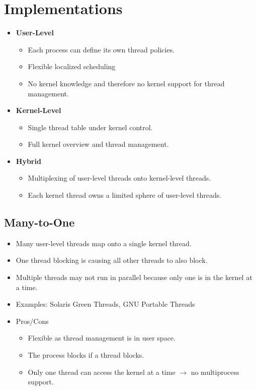 \documentclass[a4paper, 11pt, accentcolor = tud3b]{tudreport}
\providecommand{\pro}{\item[+]}
\providecommand{\con}{\item[- ]}
\begin{document}
        \section{Implementations}
            \begin{itemize}
            	\item \textbf{User-Level}
	            	\begin{itemize}
	            		\pro Each process can define its own thread policies.
	            		\pro Flexible localized scheduling
	            		\con No kernel knowledge and therefore no kernel support for thread management.
	            	\end{itemize}
            	\item \textbf{Kernel-Level}
	            	\begin{itemize}
	            		\pro Single thread table under kernel control.
	            		\pro Full kernel overview and thread management.
	            	\end{itemize}
            	\item \textbf{Hybrid}
	            	\begin{itemize}
	            		\item Multiplexing of user-level threads onto kernel-level threads.
	            		\item Each kernel thread owns a limited sphere of user-level threads.
	            	\end{itemize}
            \end{itemize}

            \subsection{Many-to-One}
                \begin{itemize}
                	\item Many user-level threads map onto a single kernel thread.
                	\item One thread blocking is causing all other threads to also block.
                	\item Multiple threads may not run in parallel because only one is in the kernel at a time.
                	\item Examples: Solaris Green Threads, GNU Portable Threads
                	\item Pros/Cons
	                	\begin{itemize}
	                		\pro Flexible as thread management is in user space.
	                		\con The process blocks if a thread blocks.
	                		\con Only one thread can access the kernel at a time \(\rightarrow\) no multiprocess support.
	                	\end{itemize}
                \end{itemize}
\end{document}
